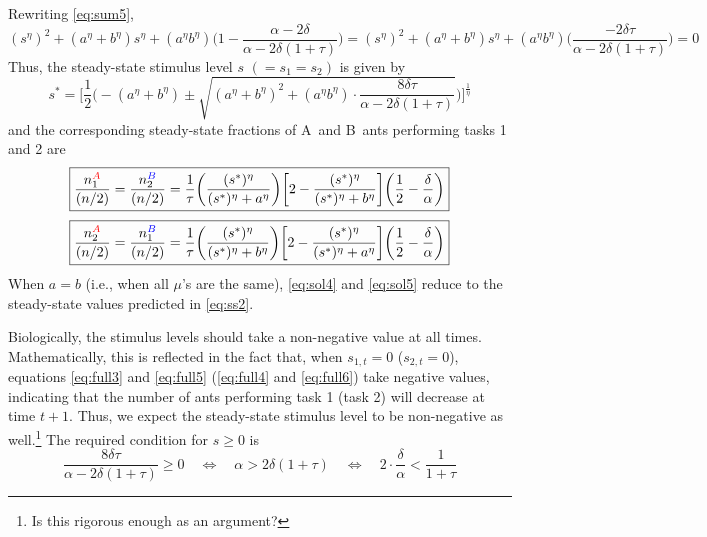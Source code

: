 \documentclass[10pt]{article}
\theoremstyle{remark}
\newcommand{\A}{{\color{red}A}}
\newcommand{\B}{{\color{blue}B}}
\begin{document}
Rewriting \eqref{eq:sum5},
\begin{equation}
    (s^\eta)^2 + ({a}^\eta + {b}^\eta) s^\eta + ({a}^\eta {b}^\eta) \bigg(1 - \frac{\alpha - 2\delta}{\alpha - 2\delta (1+\tau)}\bigg) 
    = (s^\eta)^2 + ({a}^\eta + {b}^\eta) s^\eta + ({a}^\eta {b}^\eta) \bigg(\frac{- 2\delta \tau}{\alpha - 2\delta (1+\tau)}\bigg)
    = 0
\end{equation}
Thus, the steady-state stimulus level $s$ $(=s_1 = s_2)$ is given by
\begin{equation}
\boxed{
    s^* = \bigg[\frac{1}{2} \bigg( -({a}^\eta + {b}^\eta) 
    \pm \sqrt{
    ({a}^\eta + {b}^\eta)^2 + ({a}^\eta {b}^\eta)\cdot \frac{8\delta \tau}{\alpha - 2\delta (1+\tau)}
    } \bigg)\bigg]^\frac{1}{\eta}
    }
\end{equation}
and the corresponding steady-state fractions of \A\ and \B\ ants performing tasks 1 and 2 are
\begin{equation}
\boxed{
    \frac{n_1^{\A}}{(n/2)} =  \frac{n_2^{\B}}{(n/2)} = \frac{1}{\tau} \bigg(\frac{(s^*)^\eta}{(s^*)^\eta + {a}^\eta} \bigg)\bigg[2 - \frac{(s^*)^\eta}{(s^*)^\eta + {b}^\eta}  \bigg] \bigg(\frac{1}{2} - \frac{\delta}{\alpha} \bigg)
    \label{eq:sol4}
    }
\end{equation}
\begin{equation}
\boxed{
    \frac{n_2^{\A}}{(n/2)} =  \frac{n_1^{\B}}{(n/2)}  = \frac{1}{\tau} \bigg(\frac{(s^*)^\eta}{(s^*)^\eta + {b}^\eta} \bigg)\bigg[2 - \frac{(s^*)^\eta}{(s^*)^\eta + {a}^\eta}  \bigg] \bigg(\frac{1}{2} - \frac{\delta}{\alpha} \bigg)
    \label{eq:sol5}
    }
\end{equation}
When $a = b$ (i.e., when all $\mu$'s are the same), \eqref{eq:sol4} and \eqref{eq:sol5} reduce to the steady-state values predicted in \eqref{eq:ss2}.

Biologically, the stimulus levels should take a non-negative value at all times. Mathematically, this is reflected in the fact that, when $s_{1,t} = 0$ ($s_{2,t} = 0$), equations \eqref{eq:full3} and \eqref{eq:full5} (\eqref{eq:full4} and \eqref{eq:full6}) take negative values, indicating that the number of ants performing task 1 (task 2) will decrease at time $t+1$. Thus, we expect the steady-state stimulus level to be non-negative as well.\footnote{Is this rigorous enough as an argument?} The required condition for $s \geq 0$ is
\begin{equation}
    \frac{8\delta \tau}{\alpha - 2\delta (1+\tau)} \geq 0 \quad\Longleftrightarrow\quad \alpha > 2\delta (1+\tau) \quad\Longleftrightarrow\quad 2\cdot \frac{\delta}{\alpha} < \frac{1}{1+\tau} \label{eq:cond3}
\end{equation}
\end{document}

